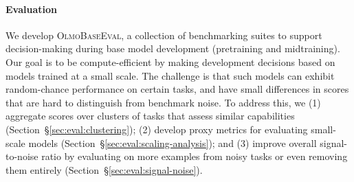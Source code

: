\documentclass[table]{ai2style/ai2}
\newcommand{\olmothreeeval}{\textsc{OlmoBaseEval}\xspace}
\begin{document}
\paragraph{Evaluation}
We develop \olmothreeeval, a collection of benchmarking suites to support decision-making during base model development (pretraining and midtraining). Our goal is to be compute-efficient by making development decisions based on models trained at a small scale. The challenge is that such models can exhibit random-chance performance on certain tasks, and have  small differences in scores that are hard to distinguish from benchmark noise. To address this, we (1) aggregate scores over clusters of tasks that assess similar capabilities (Section~\S\ref{sec:eval:clustering}); (2) develop proxy metrics for evaluating small-scale models (Section~\S\ref{sec:eval:scaling-analysis}); and (3) improve overall signal-to-noise ratio by evaluating on more examples from noisy tasks or even removing them entirely (Section~\S\ref{sec:eval:signal-noise}).
\end{document}
